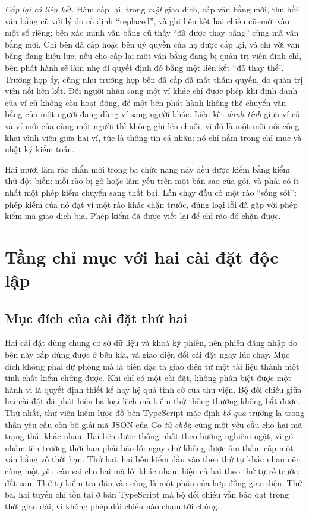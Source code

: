 \textit{Cấp lại có liên kết.} Hàm cấp lại, trong \emph{một} giao dịch, cấp văn bằng mới, thu hồi văn bằng cũ với lý do cố định ``replaced'', và ghi liên kết hai chiều cũ--mới vào một sổ riêng; bên xác minh văn bằng cũ thấy ``đã được thay bằng'' cùng mã văn bằng mới. Chỉ bên đã cấp hoặc bên uỷ quyền của họ được cấp lại, và chỉ với văn bằng đang hiệu lực: nếu cho cấp lại một văn bằng đang bị quản trị viên đình chỉ, bên phát hành sẽ làm nhẹ đi quyết định đó bằng một liên kết ``đã thay thế''. Trường hợp ấy, cũng như trường hợp bên đã cấp đã mất thẩm quyền, do quản trị viên nối liên kết. Đổi người nhận sang một ví khác chỉ được phép khi định danh của ví cũ không còn hoạt động, để một bên phát hành không thể chuyển văn bằng của một người đang dùng ví sang người khác. Liên kết \emph{danh tính} giữa ví cũ và ví mới của cùng một người thì không ghi lên chuỗi, vì đó là một mối nối công khai vĩnh viễn giữa hai ví, tức là thông tin cá nhân; nó chỉ nằm trong chỉ mục và nhật ký kiểm toán.

Hai mươi lăm rào chắn mới trong ba chức năng này đều được kiểm bằng kiểm thử đột biến: mỗi rào bị gỡ hoặc làm yếu trên một bản sao của gói, và phải có ít nhất một phép kiểm chuyển sang thất bại. Lần chạy đầu có một rào ``sống sót'': phép kiểm của nó đạt vì một rào khác chặn trước, đúng loại lỗi đã gặp với phép kiểm mã giao dịch bịa. Phép kiểm đã được viết lại để chỉ rào đó chặn được.

\section{Tầng chỉ mục với hai cài đặt độc lập}
\label{sec:hai-cai-dat}

\subsection{Mục đích của cài đặt thứ hai}

Hai cài đặt dùng chung cơ sở dữ liệu và khoá ký phiên, nên phiên đăng nhập do bên này cấp dùng được ở bên kia, và giao diện đổi cài đặt ngay lúc chạy. Mục đích không phải dự phòng mà là biến đặc tả giao diện từ một tài liệu thành một tính chất kiểm chứng được. Khi chỉ có một cài đặt, không phân biệt được một hành vi là quyết định thiết kế hay hệ quả tình cờ của thư viện. Bộ đối chiếu giữa hai cài đặt đã phát hiện ba loại lệch mà kiểm thử thông thường không bắt được. Thứ nhất, thư viện kiểm lược đồ bên TypeScript mặc định \emph{bỏ qua} trường lạ trong thân yêu cầu còn bộ giải mã JSON của Go \emph{từ chối}; cùng một yêu cầu cho hai mã trạng thái khác nhau. Hai bên được thống nhất theo hướng nghiêm ngặt, vì gõ nhầm tên trường thời hạn phải báo lỗi ngay chứ không được âm thầm cấp một văn bằng vô thời hạn. Thứ hai, hai bên kiểm đầu vào theo thứ tự khác nhau nên cùng một yêu cầu sai cho hai mã lỗi khác nhau; hiện cả hai theo thứ tự rẻ trước, đắt sau. Thứ tự kiểm tra đầu vào cũng là một phần của hợp đồng giao diện. Thứ ba, hai tuyến chỉ tồn tại ở bản TypeScript mà bộ đối chiếu vẫn báo đạt trong thời gian dài, vì không phép đối chiếu nào chạm tới chúng.

